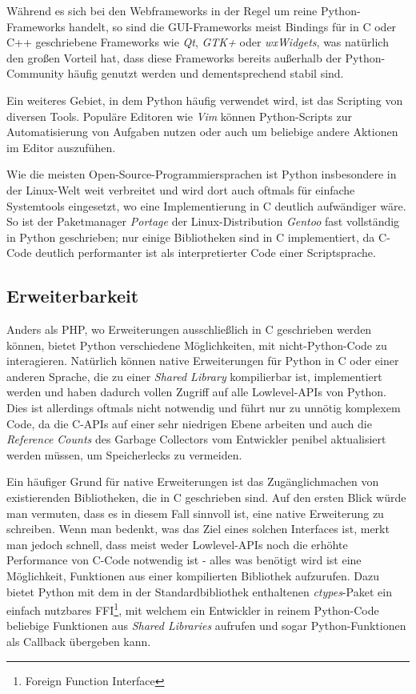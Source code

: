 Während es sich bei den Webframeworks in der Regel um reine Python-Frameworks handelt, so sind die
GUI-Frameworks meist Bindings für in C oder C++ geschriebene Frameworks wie \emph{Qt}, \emph{GTK+}
oder \emph{wxWidgets}, was natürlich den großen Vorteil hat, dass diese Frameworks bereits außerhalb
der Python-Community häufig genutzt werden und dementsprechend stabil sind.

Ein weiteres Gebiet, in dem Python häufig verwendet wird, ist das Scripting von diversen Tools.
Populäre Editoren wie \emph{Vim} können Python-Scripts zur Automatisierung von Aufgaben nutzen oder
auch um beliebige andere Aktionen im Editor auszufühen.

Wie die meisten Open-Source-Programmiersprachen ist Python insbesondere in der Linux-Welt weit
verbreitet und wird dort auch oftmals für einfache Systemtools eingesetzt, wo eine Implementierung
in C deutlich aufwändiger wäre. So ist der Paketmanager \emph{Portage} der
Linux-Distribution \emph{Gentoo} fast vollständig in Python geschrieben; nur einige Bibliotheken
sind in C implementiert, da C-Code deutlich performanter ist als interpretierter Code einer
Scriptsprache.


\subsection{Erweiterbarkeit}

Anders als PHP, wo Erweiterungen ausschließlich in C geschrieben werden können,
bietet Python verschiedene Möglichkeiten, mit nicht-Python-Code zu interagieren. Natürlich können
native Erweiterungen für Python in C oder einer anderen Sprache, die zu einer \emph{Shared Library}
kompilierbar ist, implementiert werden und haben dadurch vollen Zugriff auf alle Lowlevel-APIs
von Python. Dies ist allerdings oftmals nicht notwendig und führt nur zu unnötig komplexem Code, da
die C-APIs auf einer sehr niedrigen Ebene arbeiten und auch die \emph{Reference Counts}
des Garbage Collectors vom Entwickler penibel aktualisiert werden müssen, um Speicherlecks zu
vermeiden.

Ein häufiger Grund für native Erweiterungen ist das Zugänglichmachen von existierenden Bibliotheken,
die in C geschrieben sind. Auf den ersten Blick würde man vermuten, dass es in diesem Fall sinnvoll
ist, eine native Erweiterung zu schreiben. Wenn man bedenkt, was das Ziel eines solchen Interfaces
ist, merkt man jedoch schnell, dass meist weder Lowlevel-APIs noch die erhöhte Performance von
C-Code notwendig ist - alles was benötigt wird ist eine Möglichkeit, Funktionen aus einer
kompilierten Bibliothek aufzurufen. Dazu bietet Python mit dem in der Standardbibliothek enthaltenen
\emph{ctypes}-Paket ein einfach nutzbares FFI\footnote{Foreign Function Interface}, mit welchem ein
Entwickler in reinem Python-Code beliebige Funktionen aus \emph{Shared Libraries} aufrufen und sogar
Python-Funktionen als Callback übergeben kann.

